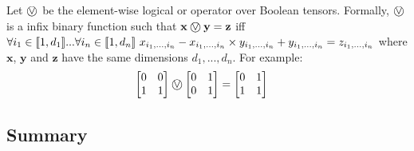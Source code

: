 \begin{definition}
	Let $\incircbin{\lor}$ be the element-wise logical or operator over Boolean tensors. Formally, $\incircbin{\lor}$ is a infix binary function such that $\mathbf{x}\incircbin{\lor}\mathbf{y}=\mathbf{z}$ iff $\forall i_1\in[\![{1,d_1}]\!]...\forall i_n\in[\![{1,d_n}]\!]\ x_{i_1,...,i_n}-x_{i_1,...,i_n}\times y_{i_1,...,i_n}+y_{i_1,...,i_n}=z_{i_1,...,i_n}$ where $\mathbf{x}$, $\mathbf{y}$ and $\mathbf{z}$ have the same dimensions $d_1,...,d_n$.
	\linespace
	For example:
	\begin{align*}
	\begin{bmatrix}
	0&0\\
	1&1\\
	\end{bmatrix}
	\incircbin{\lor}
	\begin{bmatrix}
	0&1\\
	0&1\\
	\end{bmatrix}
	&=
	\begin{bmatrix}
	0&1\\
	1&1\\
	\end{bmatrix}
	\end{align*}
\end{definition}

\subsection{Summary}

